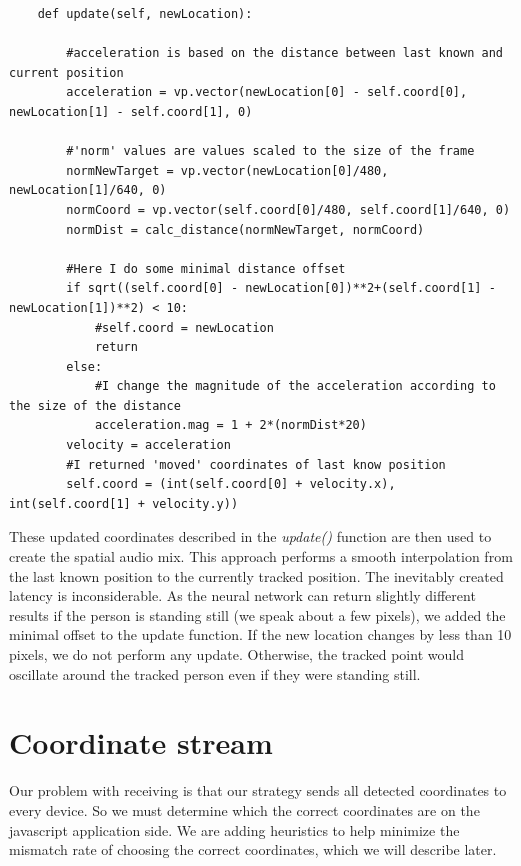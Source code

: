 \documentclass{ctuthesis}
\begin{document}
\begin{lstlisting}
    def update(self, newLocation):
    
        #acceleration is based on the distance between last known and current position
        acceleration = vp.vector(newLocation[0] - self.coord[0], newLocation[1] - self.coord[1], 0)
        
        #'norm' values are values scaled to the size of the frame
        normNewTarget = vp.vector(newLocation[0]/480, newLocation[1]/640, 0)
        normCoord = vp.vector(self.coord[0]/480, self.coord[1]/640, 0)
        normDist = calc_distance(normNewTarget, normCoord)
        
        #Here I do some minimal distance offset
        if sqrt((self.coord[0] - newLocation[0])**2+(self.coord[1] - newLocation[1])**2) < 10:
            #self.coord = newLocation
            return
        else:
            #I change the magnitude of the acceleration according to the size of the distance
            acceleration.mag = 1 + 2*(normDist*20)
        velocity = acceleration
        #I returned 'moved' coordinates of last know position
        self.coord = (int(self.coord[0] + velocity.x), int(self.coord[1] + velocity.y))
\end{lstlisting}
\label{interpolation}
These updated coordinates described in the \textit{update()} function are then used to create the spatial audio mix. This approach performs a smooth interpolation from the last known position to the currently tracked position. The inevitably created latency is inconsiderable. As the neural network can return slightly different results if the person is standing still (we speak about a few pixels), we added the minimal offset to the update function. If the new location changes by less than 10 pixels, we do not perform any update. Otherwise, the tracked point would oscillate around the tracked person even if they were standing still.

\section{Coordinate stream}
Our problem with receiving is that our strategy sends all detected coordinates to every device. So we must determine which the correct coordinates are on the javascript application side. We are adding heuristics to help minimize the mismatch rate of choosing the correct coordinates, which we will describe later.
\end{document}

